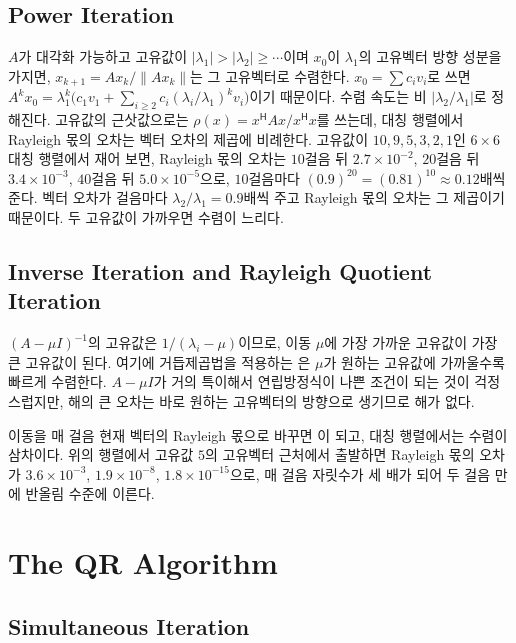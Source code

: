\subsection{Power Iteration}

$A$가 대각화 가능하고 고유값이 $|\lambda_1|>|\lambda_2|\ge\cdots$이며 $x_0$이 $\lambda_1$의 고유벡터 방향 성분을 가지면, $x_{k+1}=Ax_k/\|Ax_k\|$는 그 고유벡터로 수렴한다. $x_0=\sum c_iv_i$로 쓰면 $A^kx_0=\lambda_1^k\bigl(c_1v_1+\sum_{i\ge2}c_i(\lambda_i/\lambda_1)^kv_i\bigr)$이기 때문이다. 수렴 속도는 비 $|\lambda_2/\lambda_1|$로 정해진다. 고유값의 근삿값으로는  $\rho(x)=x^{\mathsf H}Ax/x^{\mathsf H}x$를 쓰는데, 대칭 행렬에서 Rayleigh 몫의 오차는 벡터 오차의 제곱에 비례한다. 고유값이 $10,9,5,3,2,1$인 $6\times6$ 대칭 행렬에서 재어 보면, Rayleigh 몫의 오차는 $10$걸음 뒤 $2.7\times10^{-2}$, $20$걸음 뒤 $3.4\times10^{-3}$, $40$걸음 뒤 $5.0\times10^{-5}$으로, $10$걸음마다 $(0.9)^{20}=(0.81)^{10}\approx0.12$배씩 준다. 벡터 오차가 걸음마다 $\lambda_2/\lambda_1=0.9$배씩 주고 Rayleigh 몫의 오차는 그 제곱이기 때문이다. 두 고유값이 가까우면 수렴이 느리다.

\subsection{Inverse Iteration and Rayleigh Quotient Iteration}

$(A-\mu I)^{-1}$의 고유값은 $1/(\lambda_i-\mu)$이므로, 이동 $\mu$에 가장 가까운 고유값이 가장 큰 고유값이 된다. 여기에 거듭제곱법을 적용하는 은 $\mu$가 원하는 고유값에 가까울수록 빠르게 수렴한다. $A-\mu I$가 거의 특이해서 연립방정식이 나쁜 조건이 되는 것이 걱정스럽지만, 해의 큰 오차는 바로 원하는 고유벡터의 방향으로 생기므로 해가 없다.

이동을 매 걸음 현재 벡터의 Rayleigh 몫으로 바꾸면 이 되고, 대칭 행렬에서는 수렴이 삼차이다. 위의 행렬에서 고유값 $5$의 고유벡터 근처에서 출발하면 Rayleigh 몫의 오차가 $3.6\times10^{-3}$, $1.9\times10^{-8}$, $1.8\times10^{-15}$으로, 매 걸음 자릿수가 세 배가 되어 두 걸음 만에 반올림 수준에 이른다.

\section{The QR Algorithm}
\label{sec:qr-algorithm}

\subsection{Simultaneous Iteration}

